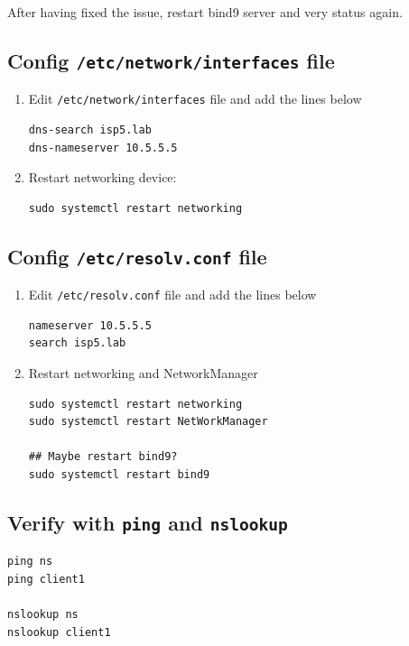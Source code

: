 \documentclass[11pt]{article}
\begin{document}
After having fixed the issue, restart bind9 server and very status again.

\subsection{Config \texttt{/etc/network/interfaces} file}
\label{sec:org78ffa3c}

\begin{enumerate}
\item Edit \texttt{/etc/network/interfaces} file and add the lines below

\begin{verbatim}
dns-search isp5.lab
dns-nameserver 10.5.5.5
\end{verbatim}

\item Restart networking device:

\begin{verbatim}
sudo systemctl restart networking
\end{verbatim}
\end{enumerate}

\subsection{Config \texttt{/etc/resolv.conf} file}
\label{sec:org9fda2dd}

\begin{enumerate}
\item Edit \texttt{/etc/resolv.conf} file and add the lines below

\begin{verbatim}
nameserver 10.5.5.5
search isp5.lab
\end{verbatim}

\item Restart networking and NetworkManager
\begin{verbatim}
sudo systemctl restart networking
sudo systemctl restart NetWorkManager

## Maybe restart bind9?
sudo systemctl restart bind9
\end{verbatim}
\end{enumerate}

\subsection{Verify with \texttt{ping} and \texttt{nslookup}}
\label{sec:org07c3c5b}

\begin{verbatim}
ping ns
ping client1

nslookup ns
nslookup client1
\end{verbatim}
\end{document}
